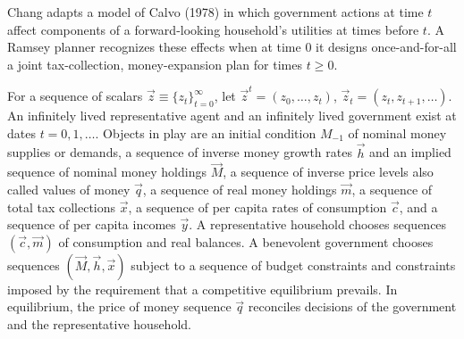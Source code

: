 Chang adapts a  model of  Calvo (1978) in which %
%
government actions at time $t$ affect components of a  forward-looking household's  utilities at times  before $t$.
 A Ramsey planner recognizes these effects  when at time $0$ it designs once-and-for-all a joint tax-collection, money-expansion  plan
for times $t \geq 0$.%


 For a sequence of scalars $\vec z \equiv \{z_t\}_{t=0}^\infty$, let $\vec z^t = (z_0,  \ldots , z_t)$,
$\vec z_t = (z_t, z_{t+1}, \ldots )$.
An infinitely lived representative agent and an infinitely lived government exist at dates $t = 0, 1, \ldots$.
Objects in play are an initial condition $M_{-1}$ of
nominal money supplies or demands,  a sequence of inverse money
growth rates $\vec h$  and an implied  sequence of nominal money
holdings $\vec M$, a  sequence of inverse price levels also called  values of money  $\vec q$,  a sequence of real money holdings $\vec m$, a sequence of total tax collections $\vec x$, a sequence
of per capita rates of consumption $\vec c$,
and a sequence of per capita incomes $\vec y$. A representative household chooses sequences
$(\vec c, \vec m)$ of consumption and real balances. A  benevolent government chooses  sequences $(\vec M, \vec h, \vec x)$  subject to a sequence of budget constraints
and  constraints  imposed by the requirement that a competitive equilibrium prevails.   In equilibrium, the price of money sequence  $\vec q$  reconciles  decisions of the government and the representative household.


